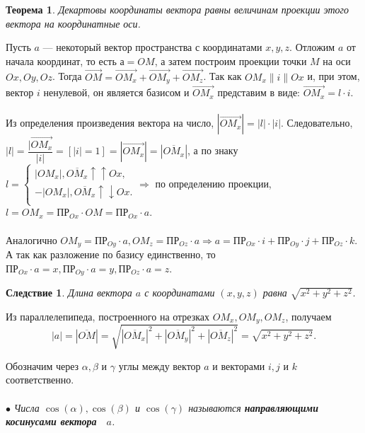 \newtheorem*{th2_3_1}{Теорема}\begin{th2_3_1}Декартовы координаты вектора равны величинам проекции этого вектора на координатные
	оси.
\end{th2_3_1}\begin{Proof}
	Пусть $a$ --- некоторый вектор пространства с координатами $x, y, z$. Отложим $a$ от начала координат, то есть $а = OM$, а затем построим проекции точки $M$ на оси $Ox, Oy, Oz$. Тогда $\overrightarrow{OM} = \overrightarrow{OM_x} + \overrightarrow{OM_y} + \overrightarrow{OM_z}$. Так как $OM_x \parallel i \parallel Ox$ и, при этом, вектор $i$ ненулевой, он является базисом и $\overrightarrow{OM_x}$ представим в виде: $\overrightarrow{OM_x} = l\cdot i$.\\\\
	Из определения произведения вектора на число, $|\overrightarrow{OM_x}| = |l|\cdot|i|$. Следовательно, $|l| = \dfrac{|\overrightarrow{OM_x}}{|i|} = [|i| = 1] = |\overrightarrow{OM_x}| = |\overline{OM_x}|$, а по знаку $l = \begin{cases}
		|OM_x|, \overline{OM_x} \uparrow\uparrow Ox,\\
		-|OM_x|, \overline{OM_x} \uparrow\downarrow Ox.\\
	\end{cases}\Rightarrow$ по определению проекции, $l = OM_x = \text{ПР}_{Ox}\cdot OM = \text{ПР}_{Ox}\cdot a$.\\\\
	Аналогично $OM_y = \text{ПР}_{Oy}\cdot a, OM_z = \text{ПР}_{Oz}\cdot a\Rightarrow a = \text{ПР}_{Ox}\cdot i + \text{ПР}_{Oy}\cdot j + \text{ПР}_{Oz}\cdot k$. А так как разложение по базису единственно, то $\text{ПР}_{Ox}\cdot a = x, \text{ПР}_{Oy}\cdot a = y, \text{ПР}_{Oz}\cdot a = z$.
\end{Proof}
\newtheorem*{cor2_3_1}{Следствие}\begin{cor2_3_1}Длина вектора $a$ с координатами $(x, y, z)$ равна $\sqrt{x^2 + y^2 + z^2}$.
\end{cor2_3_1}\begin{Proof}
	Из параллелепипеда, построенного на отрезках $OM_x, OM_y, OM_z$, получаем $$|a| = |\overline{OM}| = \sqrt{|\overline{OM_x}|^2 + |\overline{OM_y}|^2 + |\overline{OM_z}|^2} = \sqrt{x^2 + y^2 + z^2}.$$
\end{Proof}
Обозначим через $\alpha, \beta$ и $\gamma$ углы между вектор $a$ и векторами $i, j$ и $k$ соответственно.\\\\
$\bullet$ \textit{Числа $\cos(\alpha), \cos(\beta)$ и $\cos(\gamma)$ называются \textbf{направляющими косинусами вектора~ $a$}.}
